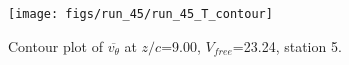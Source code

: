 \begin{figure}[H]
\centering
\texttt{[image: figs/run\_45/run\_45\_T\_contour]}
\caption{Contour plot of $\overline{v_{\theta}}$ at $z/c$=9.00, $V_{free}$=23.24, station 5.}
\label{fig:run_45_T_contour}
\end{figure}



